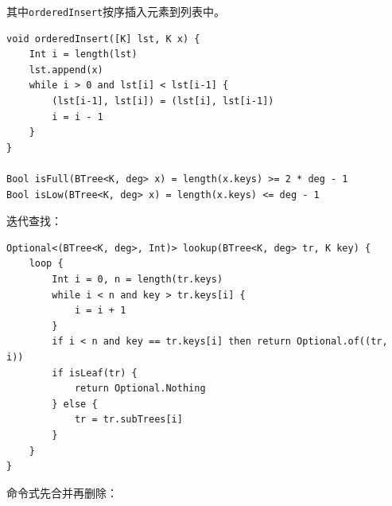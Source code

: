 \documentclass[b5paper]{ctexart}
\begin{document}
其中\texttt{orderedInsert}按序插入元素到列表中。

\begin{lstlisting}[language = Bourbaki]
void orderedInsert([K] lst, K x) {
    Int i = length(lst)
    lst.append(x)
    while i > 0 and lst[i] < lst[i-1] {
        (lst[i-1], lst[i]) = (lst[i], lst[i-1])
        i = i - 1
    }
}

Bool isFull(BTree<K, deg> x) = length(x.keys) >= 2 * deg - 1
Bool isLow(BTree<K, deg> x) = length(x.keys) <= deg - 1
\end{lstlisting}

迭代查找：

\begin{lstlisting}[language = Bourbaki]
Optional<(BTree<K, deg>, Int)> lookup(BTree<K, deg> tr, K key) {
    loop {
        Int i = 0, n = length(tr.keys)
        while i < n and key > tr.keys[i] {
            i = i + 1
        }
        if i < n and key == tr.keys[i] then return Optional.of((tr, i))
        if isLeaf(tr) {
            return Optional.Nothing
        } else {
            tr = tr.subTrees[i]
        }
    }
}
\end{lstlisting}

命令式先合并再删除：
\end{document}
